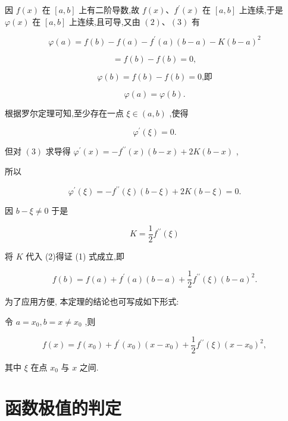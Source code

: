 \documentclass[lang=cn,newtx,10pt,scheme=chinese]{elegantbook}
\begin{document}
因 \(f\left( x\right)\) 在 \(\left\lbrack {a,b}\right\rbrack\) 上有二阶导数,故 \(f\left( x\right) \text{、}{f}^{\prime }\left( x\right)\) 在 \(\left\lbrack {a,b}\right\rbrack\) 上连续,于是 \(\varphi \left( x\right)\) 在 \(\left\lbrack {a,b}\right\rbrack\) 上连续,且可导,又由 \(\left( 2\right) \text{、}\left( 3\right)\) 有

\[
\varphi \left( a\right) = f\left( b\right) - f\left( a\right) - {f}^{\prime }\left( a\right) \left( {b - a}\right) - K{\left( b - a\right) }^{2}
\]

\[
= f\left( b\right) - f\left( b\right) = 0,
\]

\[
\varphi \left( b\right) = f\left( b\right) - f\left( b\right) = 0\text{,即}
\]

\[
\varphi \left( a\right) = \varphi \left( b\right) \text{.}
\]

根据罗尔定理可知,至少存在一点 \(\xi \in \left( {a,b}\right)\) ,使得

\[
{\varphi }^{\prime }\left( \xi \right) = 0.
\]

但对 \(\left( 3\right)\) 求导得 \({\varphi }^{\prime }\left( x\right) = - {f}^{\prime \prime }\left( x\right) \left( {b - x}\right) + {2K}\left( {b - x}\right)\) ,

所以

\[
{\varphi }^{\prime }\left( \xi \right) = - {f}^{\prime \prime }\left( \xi \right) \left( {b - \xi }\right) + {2K}\left( {b - \xi }\right) = 0.
\]

因 \(b - \xi \neq 0\) 于是

\[
K = \frac{1}{2}{f}^{\prime \prime }\left( \xi \right)
\]

将 \(K\) 代入 (2)得证 (1) 式成立,即

\[
f\left( b\right) = f\left( a\right) + {f}^{\prime }\left( a\right) \left( {b - a}\right) + \frac{1}{2}{f}^{\prime \prime }\left( \xi \right) {\left( b - a\right) }^{2}.
\]

为了应用方便, 本定理的结论也可写成如下形式:

令 \(a = {x}_{0},b = x \neq {x}_{0}\) ,则

\[
f\left( x\right) = f\left( {x}_{0}\right) + {f}^{\prime }\left( {x}_{0}\right) \left( {x - {x}_{0}}\right) + \frac{1}{2}{f}^{\prime \prime }\left( \xi \right) {\left( x - {x}_{0}\right) }^{2}, \tag{4}
\]

其中 \(\xi\) 在点 \({x}_{0}\) 与 \(x\) 之间.

\section{函数极值的判定}
\end{document}
